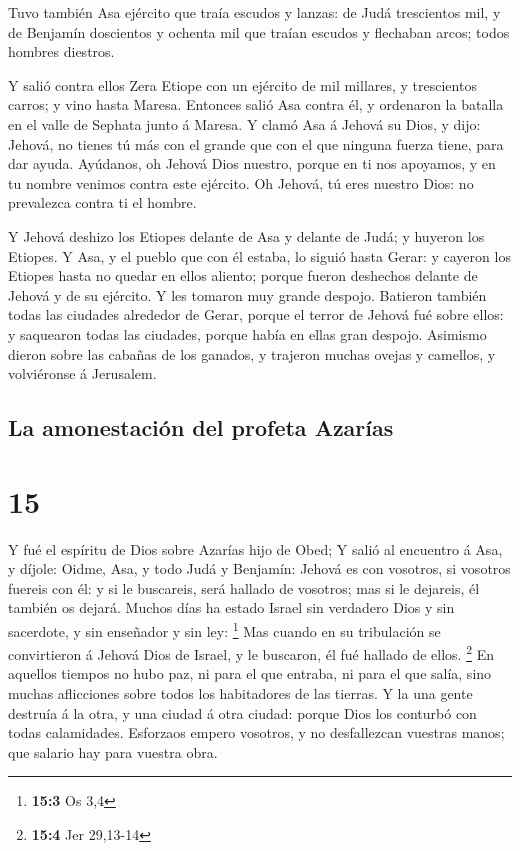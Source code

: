  Tuvo también Asa ejército que traía escudos y lanzas: de
Judá trescientos mil, y de Benjamín doscientos y ochenta mil que traían
escudos y flechaban arcos; todos hombres diestros.

 Y salió contra ellos Zera Etiope con un ejército de mil
millares, y trescientos carros; y vino hasta Maresa. 
Entonces salió Asa contra él, y ordenaron la batalla en el valle de
Sephata junto á Maresa.  Y clamó Asa á Jehová su Dios, y
dijo: Jehová, no tienes tú más con el grande que con el que ninguna
fuerza tiene, para dar ayuda. Ayúdanos, oh Jehová Dios nuestro, porque
en ti nos apoyamos, y en tu nombre venimos contra este ejército. Oh
Jehová, tú eres nuestro Dios: no prevalezca contra ti el hombre.

 Y Jehová deshizo los Etiopes delante de Asa y delante de
Judá; y huyeron los Etiopes.  Y Asa, y el pueblo que con
él estaba, lo siguió hasta Gerar: y cayeron los Etiopes hasta no quedar
en ellos aliento; porque fueron deshechos delante de Jehová y de su
ejército. Y les tomaron muy grande despojo.  Batieron
también todas las ciudades alrededor de Gerar, porque el terror de
Jehová fué sobre ellos: y saquearon todas las ciudades, porque había en
ellas gran despojo.  Asimismo dieron sobre las cabañas de
los ganados, y trajeron muchas ovejas y camellos, y volviéronse á
Jerusalem.

\hypertarget{la-amonestaciuxf3n-del-profeta-azaruxedas}{%
\subsection{La amonestación del profeta
Azarías}\label{la-amonestaciuxf3n-del-profeta-azaruxedas}}

\hypertarget{section-14}{%
\section{15}\label{section-14}}

 Y fué el espíritu de Dios sobre Azarías hijo de Obed;
 Y salió al encuentro á Asa, y díjole: Oidme, Asa, y todo
Judá y Benjamín: Jehová es con vosotros, si vosotros fuereis con él: y
si le buscareis, será hallado de vosotros; mas si le dejareis, él
también os dejará.  Muchos días ha estado Israel sin
verdadero Dios y sin sacerdote, y sin enseñador y sin ley: \footnote{\textbf{15:3}
  Os 3,4}  Mas cuando en su tribulación se convirtieron á
Jehová Dios de Israel, y le buscaron, él fué hallado de ellos.
\footnote{\textbf{15:4} Jer 29,13-14}  En aquellos tiempos
no hubo paz, ni para el que entraba, ni para el que salía, sino muchas
aflicciones sobre todos los habitadores de las tierras.  Y
la una gente destruía á la otra, y una ciudad á otra ciudad: porque Dios
los conturbó con todas calamidades.  Esforzaos empero
vosotros, y no desfallezcan vuestras manos; que salario hay para vuestra
obra.

